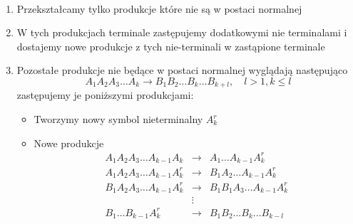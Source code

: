 	\begin{alg}~\\
		\begin{enumerate}
			\item Przekształcamy tylko produkcje które nie są w postaci normalnej
			\item W tych produkcjach terminale zastępujemy dodatkowymi nie terminalami i dostajemy nowe produkcje
			z tych nie-terminali w zastąpione terminale
			\item Pozostałe produkcje nie będące w postaci normalnej wyglądają następująco
				\begin{equation}
					A_1A_2A_3\dots A_k \rightarrow B_1B_2\dots B_k\dots B_{k+l}, \quad l > 1, k \leqslant l 
				\end{equation}
			zastępujemy je poniższymi produkcjami:
				\begin{itemize}
					\item Tworzymy nowy symbol nieterminalny $A^r_k$
					\item Nowe produkcje
						\begin{eqnarray}						
							A_1A_2A_3\dots A_{k-1}A_k &\rightarrow& A_1\dots A_{k-1}A^r_k \\
							A_1A_2A_3\dots A_{k-1}A^r_k &\rightarrow& B_1A_2\dots A_{k-1}A^r_k \\
							B_1A_2A_3\dots A_{k-1}A^r_k &\rightarrow& B_1B_1A_3\dots A_{k-1}A^r_k\\
							&\vdots&\\
							B_1\dots B_{k-1}A^r_k &\rightarrow& B_1B_2\dots B_k\dots B_{k-l}\\
						\end{eqnarray}
				\end{itemize}
		\end{enumerate}
	\end{alg}
	
	